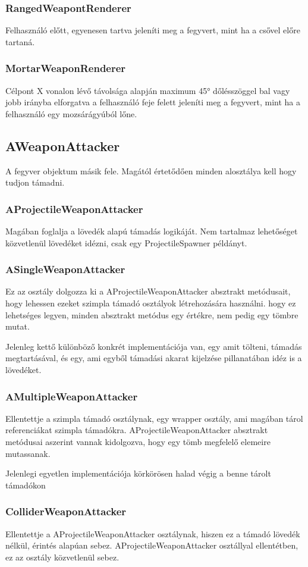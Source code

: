 \documentclass[
]{thesis-ekf}
\theoremstyle{definition}
\theoremstyle{remark}
\begin{document}
	\subsubsection{RangedWeapontRenderer}
	Felhasználó előtt, egyenesen tartva jeleníti meg a fegyvert, mint ha a csővel előre tartaná.
	\subsubsection{MortarWeaponRenderer}
	Célpont X vonalon lévő távolsága alapján maximum 45° dőlésszöggel bal vagy jobb irányba elforgatva a felhasználó feje felett jeleníti meg a fegyvert, mint ha a felhasználó egy mozsárágyúból lőne.
	\subsection{AWeaponAttacker}
	A fegyver objektum másik fele. Magától értetődően minden alosztálya kell hogy tudjon támadni.
	\subsubsection{AProjectileWeaponAttacker}
	Magában foglalja a lövedék alapú támadás logikáját. Nem tartalmaz lehetőséget közvetlenül lövedéket idézni, csak egy ProjectileSpawner példányt.
	\subsubsection{ASingleWeaponAttacker}
	Ez az osztály dolgozza ki a AProjectileWeaponAttacker absztrakt metódusait, hogy lehessen ezeket szimpla támadó osztályok létrehozására használni. hogy ez lehetséges legyen, minden absztrakt metódus egy értékre, nem pedig egy tömbre mutat.
	
	Jelenleg kettő különböző konkrét implementációja van, egy amit tölteni, támadás megtartásával, és egy, ami egyből támadási akarat kijelzése pillanatában idéz is a lövedéket.
	\subsubsection{AMultipleWeaponAttacker}
	Ellentettje a szimpla támadó osztálynak, egy wrapper osztály, ami magában tárol referenciákat szimpla támadókra. AProjectileWeaponAttacker absztrakt metódusai aszerint vannak kidolgozva, hogy egy tömb megfelelő elemeire mutassanak.
	
	Jelenlegi egyetlen implementációja körkörösen halad végig a benne tárolt támadókon
	\subsubsection{ColliderWeaponAttacker}
	Ellentettje a AProjectileWeaponAttacker osztálynak, hiszen ez a támadó lövedék nélkül, érintés alapúan sebez. AProjectileWeaponAttacker osztállyal ellentétben, ez az osztály közvetlenül sebez.
\end{document}
